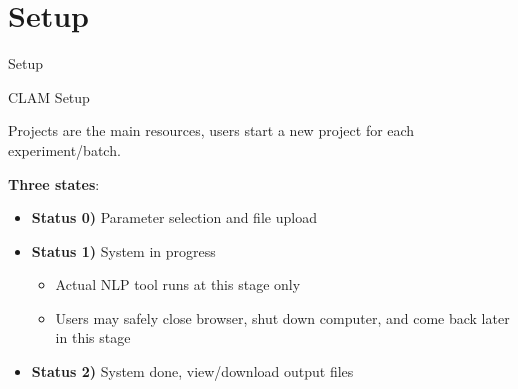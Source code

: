 \documentclass[compress]{beamer}
\begin{document}
\section{Setup}

\begin{frame}{Setup}
    \begin{block}{CLAM Setup}

            Projects are the main resources, users start a new project for each experiment/batch.
    
            \textbf{Three states}:

            \begin{itemize}
                \item \textbf{Status 0)} Parameter selection and file upload
                \item \textbf{Status 1)} System in progress
                \begin{itemize}
                    \item Actual NLP tool runs at this stage only
                    \item Users may safely close browser, shut down computer, and come back later in this stage
                \end{itemize}
                \item \textbf{Status 2)} System done, view/download output files
            \end{itemize}


    \end{block}
\end{frame}
\end{document}

